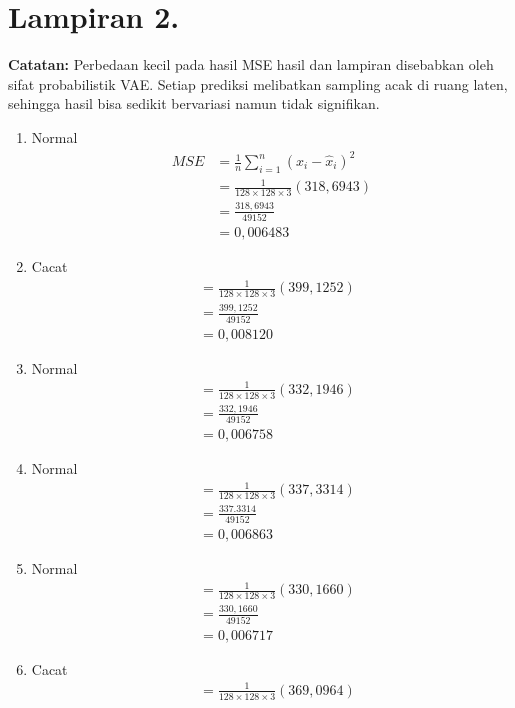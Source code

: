 \section*{Lampiran 2. }
\label{Lampiran 2}
{\small
  \noindent\textbf{Catatan:} Perbedaan kecil pada hasil MSE hasil dan
  lampiran disebabkan oleh sifat probabilistik VAE. Setiap prediksi
  melibatkan sampling acak di ruang laten, sehingga hasil bisa
  sedikit bervariasi namun tidak signifikan.
}
\begin{enumerate}
  \item Normal
    \begin{align*}
      MSE &= \frac{1}{n} \sum_{i=1}^{n} (x_i - \hat{x}_i)^2 \\
      &= \frac{1}{128 \times 128 \times 3} (318,6943) \\
      &= \frac{318,6943}{49152} \\
      &= 0,006483
    \end{align*}
  \item Cacat
    \begin{align*}
      &= \frac{1}{128 \times 128 \times 3} (399,1252) \\
      &= \frac{399,1252}{49152} \\
      &= 0,008120
    \end{align*}
  \item Normal
    \begin{align*}
      &= \frac{1}{128 \times 128 \times 3} (332,1946) \\
      &= \frac{332,1946}{49152} \\
      &= 0,006758
    \end{align*}
  \item Normal
    \begin{align*}
      &= \frac{1}{128 \times 128 \times 3} (337,3314) \\
      &= \frac{337.3314}{49152} \\
      &= 0,006863
    \end{align*}
  \item Normal
    \begin{align*}
      &= \frac{1}{128 \times 128 \times 3} (330,1660) \\
      &= \frac{330,1660}{49152} \\
      &= 0,006717
    \end{align*}
  \item Cacat
    \begin{align*}
      &= \frac{1}{128 \times 128 \times 3} (369,0964) \\

\end{align*}
\end{enumerate}
